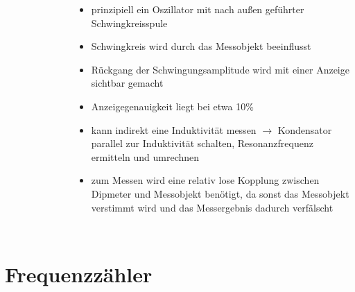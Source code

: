 \begin{frame}
\begin{columns}
\begin{center}
\begin{figure}
      \end{figure}
    \end{center}
    \begin{itemize}
      \item prinzipiell ein Oszillator mit nach außen geführter Schwingkreisspule
      \item Schwingkreis wird durch das Messobjekt beeinflusst
      \item Rückgang der Schwingungsamplitude wird mit einer Anzeige sichtbar gemacht
      \item Anzeigegenauigkeit liegt bei etwa 10\%
      \item kann indirekt eine Induktivität messen $\rightarrow$ Kondensator parallel zur Induktivität schalten, Resonanzfrequenz ermitteln und umrechnen
      \item zum Messen wird eine relativ lose Kopplung zwischen Dipmeter und Messobjekt benötigt, da sonst das Messobjekt verstimmt wird und das Messergebnis dadurch verfälscht
    \end{itemize}
  \end{columns}
\end{frame}

\section*{Frequenzzähler}

